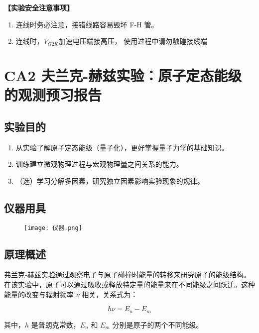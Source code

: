 \documentclass[dvipsnames, svgnames,a4paper,11pt]{article}
\begin{document}
	\textbf{【实验安全注意事项】}	
	\begin{enumerate}
		\item 连线时务必注意，接错线路容易毁坏 F-H 管。
		\item 连线时，$ V_{G2K}$加速电压端接高压， 使用过程中请勿触碰接线端
	\end{enumerate}
	
	\clearpage
	\tableofcontents
	\clearpage
	
	
	
	
	\setcounter{section}{0}
	\section{CA2 夫兰克-赫兹实验：原子定态能级的观测\quad\heiti 预习报告}
	
	\subsection{实验目的}
	\begin{enumerate}
		\item 从实验了解原子定态能级（量子化），更好掌握量子力学的基础知识。
		\item 训练建立微观物理过程与宏观物理量之间关系的能力。
		\item （选）学习分解多因素，研究独立因素影响实验现象的规律。
	\end{enumerate}
	
	\subsection{仪器用具}
	\begin{figure}[{H}]
		\centering
		\texttt{[image: 仪器.png]}
		\label{}
	\end{figure}
	
	\subsection{原理概述}
	弗兰克-赫兹实验通过观察电子与原子碰撞时能量的转移来研究原子的能级结构。在该实验中，原子可以通过吸收或释放特定量的能量来在不同能级之间跃迁。这种能量的改变与辐射频率 $\nu$ 相关，关系式为：

$$
h\nu = E_n - E_m
$$

其中，$h$ 是普朗克常数，$E_n$ 和 $E_m$ 分别是原子的两个不同能级。
\end{document}
